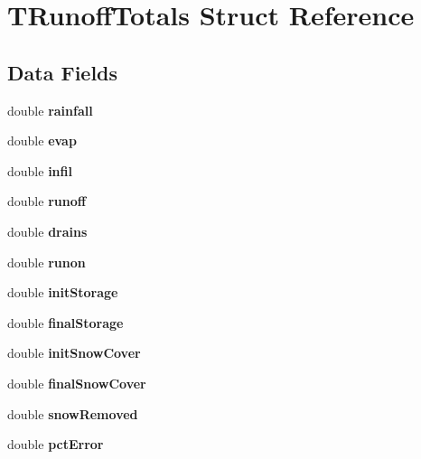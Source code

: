 \hypertarget{struct_t_runoff_totals}{}\section{T\+Runoff\+Totals Struct Reference}
\label{struct_t_runoff_totals}
\subsection*{Data Fields}
\begin{DoxyCompactItemize}
\item 
\mbox{\label{struct_t_runoff_totals_a9a8e5a58f921fe19a35fded1d0984c6c}} 
double {\bfseries rainfall}
\item 
\mbox{\label{struct_t_runoff_totals_a90a48831849f8794a1ab4988b4755e23}} 
double {\bfseries evap}
\item 
\mbox{\label{struct_t_runoff_totals_a870be47f33955d02d624bc9de06adad0}} 
double {\bfseries infil}
\item 
\mbox{\label{struct_t_runoff_totals_a365dc60f2331a4280fc2be55b822191c}} 
double {\bfseries runoff}
\item 
\mbox{\label{struct_t_runoff_totals_a4ccd57abeb0263caf3aeafd5ceac92e2}} 
double {\bfseries drains}
\item 
\mbox{\label{struct_t_runoff_totals_a9c2f6d7b4e1741bc149a8f38ec6cc22d}} 
double {\bfseries runon}
\item 
\mbox{\label{struct_t_runoff_totals_a9d790bfe173117a2e0a66dda16221337}} 
double {\bfseries init\+Storage}
\item 
\mbox{\label{struct_t_runoff_totals_abe8e4d2ea662bd74d1fb8a14ab0a02ca}} 
double {\bfseries final\+Storage}
\item 
\mbox{\label{struct_t_runoff_totals_ab7d94151d58109f55c42b8ce0ac868c4}} 
double {\bfseries init\+Snow\+Cover}
\item 
\mbox{\label{struct_t_runoff_totals_a567552e4045e843d6f0274814ad5e2d0}} 
double {\bfseries final\+Snow\+Cover}
\item 
\mbox{\label{struct_t_runoff_totals_a61743e824c491f5f777cd4fc2e84add2}} 
double {\bfseries snow\+Removed}
\item 
\mbox{\label{struct_t_runoff_totals_a6fcd79c6a0e66f48c596ff03935b6675}} 
double {\bfseries pct\+Error}
\end{DoxyCompactItemize}


